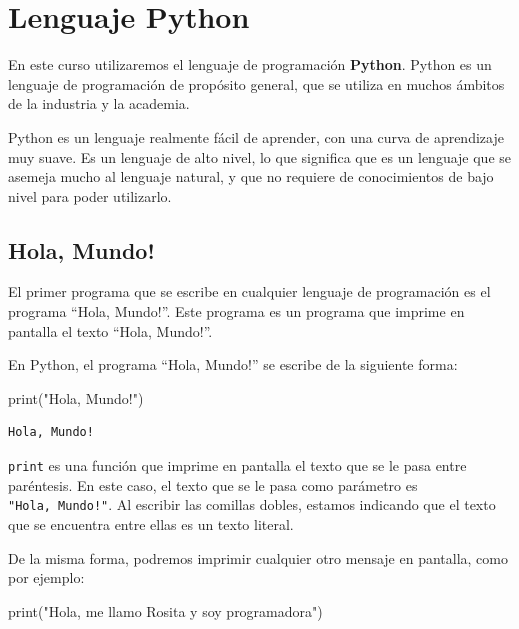 \documentclass[
  letterpaper,
  DIV=11,
  numbers=noendperiod]{scrreprt}
\newenvironment{Shaded}{\begin{snugshade}}{\end{snugshade}}
\newcommand{\BuiltInTok}[1]{\textcolor[rgb]{0.00,0.23,0.31}{#1}}
\newcommand{\NormalTok}[1]{\textcolor[rgb]{0.00,0.23,0.31}{#1}}
\newcommand{\StringTok}[1]{\textcolor[rgb]{0.13,0.47,0.30}{#1}}
\begin{document}
\section{Lenguaje Python}\label{lenguaje-python}

En este curso utilizaremos el lenguaje de programación \textbf{Python}.
Python es un lenguaje de programación de propósito general, que se
utiliza en muchos ámbitos de la industria y la academia.

Python es un lenguaje realmente fácil de aprender, con una curva de
aprendizaje muy suave. Es un lenguaje de alto nivel, lo que significa
que es un lenguaje que se asemeja mucho al lenguaje natural, y que no
requiere de conocimientos de bajo nivel para poder utilizarlo.

\subsection{Hola, Mundo!}\label{hola-mundo}

El primer programa que se escribe en cualquier lenguaje de programación
es el programa ``Hola, Mundo!''. Este programa es un programa que
imprime en pantalla el texto ``Hola, Mundo!''.

En Python, el programa ``Hola, Mundo!'' se escribe de la siguiente
forma:

\begin{Shaded}
\begin{Highlighting}[]
\BuiltInTok{print}\NormalTok{(}\StringTok{"Hola, Mundo!"}\NormalTok{)}
\end{Highlighting}
\end{Shaded}

\begin{verbatim}
Hola, Mundo!
\end{verbatim}

\texttt{print} es una función que imprime en pantalla el texto que se le
pasa entre paréntesis. En este caso, el texto que se le pasa como
parámetro es \texttt{"Hola,\ Mundo!"}. Al escribir las comillas dobles,
estamos indicando que el texto que se encuentra entre ellas es un texto
literal.

De la misma forma, podremos imprimir cualquier otro mensaje en pantalla,
como por ejemplo:

\begin{Shaded}
\begin{Highlighting}[]
\BuiltInTok{print}\NormalTok{(}\StringTok{"Hola, me llamo Rosita y soy programadora"}\NormalTok{)}
\end{Highlighting}
\end{Shaded}
\end{document}
